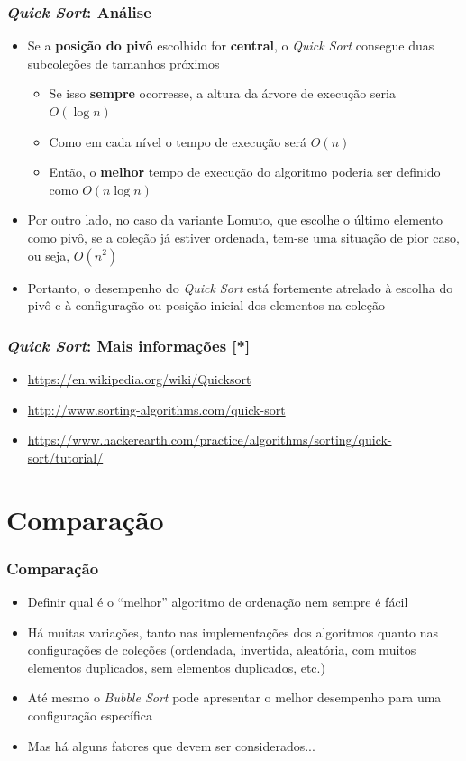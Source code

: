 \documentclass[aspectratio=169]{beamer}
\begin{document}
\begin{frame}[fragile]\frametitle{\emph{Quick Sort}: Análise}
\begin{itemize}
	\item Se a \textbf{posição do pivô} escolhido for \textbf{central}, o \emph{Quick Sort} consegue duas subcoleções de tamanhos próximos
	\begin{itemize}
		\item Se isso \textbf{sempre} ocorresse, a altura da árvore de execução seria $O(\log{n})$
		\item Como em cada nível o tempo de execução será $O(n)$
		\item Então, o \textbf{melhor} tempo de execução do algoritmo poderia ser definido como $O(n\log{n})$
	\end{itemize}
	\item Por outro lado, no caso da variante Lomuto, que escolhe o último elemento como pivô, se a coleção já estiver ordenada, tem-se uma situação de pior caso, ou seja, $O(n^2)$
	\item Portanto, o desempenho do \emph{Quick Sort} está fortemente atrelado à escolha do pivô e à configuração ou posição inicial dos elementos na coleção
\end{itemize}
\end{frame}

\begin{frame}[fragile]\frametitle{\emph{Quick Sort}: Mais informações [*]}
\begin{itemize}
	\item \url{https://en.wikipedia.org/wiki/Quicksort}
	\item \url{http://www.sorting-algorithms.com/quick-sort}
	\item \url{https://www.hackerearth.com/practice/algorithms/sorting/quick-sort/tutorial/}
\end{itemize}
\end{frame}

\section{Comparação}

\begin{frame}[fragile]\frametitle{Comparação}
\begin{itemize}
	\item Definir qual é o ``melhor'' algoritmo de ordenação nem sempre é fácil
	\item Há muitas variações, tanto nas implementações dos algoritmos quanto nas configurações de coleções (ordendada, invertida, aleatória, com muitos elementos duplicados, sem elementos duplicados, etc.)
	\item Até mesmo o \emph{Bubble Sort} pode apresentar o melhor desempenho para uma configuração específica
	\item Mas há alguns fatores que devem ser considerados...
\end{itemize}
\end{frame}
\end{document}
